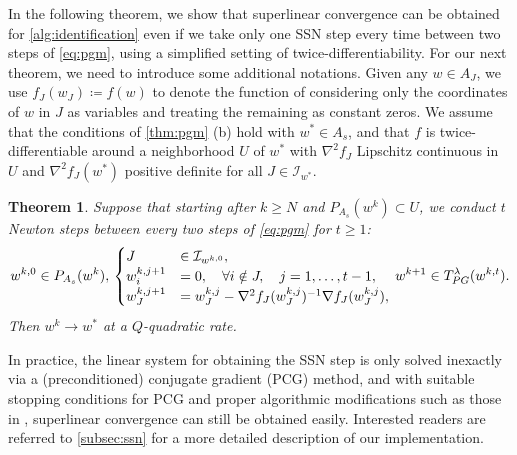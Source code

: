 \documentclass{article}
\newcommand{\alert}[1]{{#1}}
\theoremstyle{plain}
\newtheorem{theorem}{Theorem}[section]
\theoremstyle{definition}
\theoremstyle{remark}
\newcommand{\I}{\mathcal{I}}
\newcommand{\Tpg}{T_{\rm PG}^{\lambda}}
\begin{document}
In the following theorem, we show that superlinear convergence can be
obtained for \cref{alg:identification} even if we take only one SSN
step every time between two steps of \cref{eq:pgm}, using a simplified
setting of twice-differentiability.
\alert{For our next theorem}, we need to introduce some additional notations.
Given any $w \in A_J$, we use $f_{J}(w_J) \coloneqq f(w)$ to
denote the function of considering only the coordinates of $w$ in
$J$ as variables and treating the remaining as constant zeros.
\alert{We assume that the conditions of \cref{thm:pgm} (b) hold with $w^* \in 
A_s$, and that $f$ is
twice-differentiable around a neighborhood $U$ of $w^*$ with
$\nabla^2 f_J$ Lipschitz continuous in $U$ and $\nabla^2 f_J(w^*)$
positive definite for all $J \in \I_{w^*}$.}
\begin{theorem}
\alert{Suppose that starting after $k
\geq N$ and $P_{A_s}(w^k) \subset U$}, we conduct $t$ Newton steps
between every two steps of \cref{eq:pgm} for $t \geq 1$:
	\begin{equation}
	\label{eq:newton}
	w^{k,0} \in  P_{A_s}(w^k), \,
	\begin{cases}
	J &\in  \I_{w^{k,0}},\\
	w^{k,j+1}_{i} &= 0, \quad \forall i \notin J, \quad j=1,\dotsc,t-1,\\
	w^{k,j+1}_J &= w^{k,j}_J -
	\nabla^2 f_J(w^{k,j}_J)^{-1} \nabla f_J(w^{k,j}_J),\\
	\end{cases}
	\,
	w^{k+1} \in \Tpg (w^{k,t}).
	\end{equation}
Then $w^k \rightarrow w^*$ at a $Q$-quadratic rate.
\label{thm:newton}
\end{theorem}


In practice, the linear system for obtaining the SSN step is only
solved inexactly via a (preconditioned) conjugate gradient (PCG) method,
and with suitable stopping conditions for PCG and proper algorithmic
modifications such as those in \cite{MCY19a,MorYZZ20a},
superlinear convergence can still be obtained easily.
Interested readers are referred to \cref{subsec:ssn} for a more detailed
description of our implementation.
\end{document}
